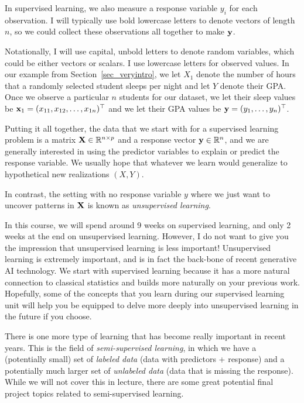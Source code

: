 In supervised learning, we also measure a response variable $y_i$ for each observation. I will typically use bold lowercase letters to denote vectors of length $n$, so we could collect these observations all together to make $\bold{y}$.

Notationally, I will use capital, unbold letters to denote random variables, which could be either vectors or scalars. I use lowercase letters for observed values. In our example from Section~\ref{sec_veryintro}, we let $X_1$ denote the number of hours that a randomly selected student sleeps per night and let $Y$ denote their GPA. Once we observe a particular $n$ students for our dataset, we let their sleep values be $\bold{x}_1 = (x_{11}, x_{12},\ldots, x_{1n})^\top$ and we let their GPA values be $\bold{y} = (y_1,\ldots,y_{n})^\top$.  

Putting it all together, the data that we start with for a supervised learning problem is a matrix $\bold{X} \in \mathbb{R}^{n \times p}$ and a response vector $\bold{y} \in \mathbb{R}^n$, and we are generally interested in using the predictor variables to explain or predict the response variable. We usually hope that whatever we learn would generalize to hypothetical new realizations $(X,Y)$. 

In contrast, the setting with no response variable $y$ where we just want to uncover patterns in $\bold{X}$ is known as \emph{unsupervised learning}.

In this course, we will spend around 9 weeks on supervised learning, and only 2 weeks at the end on unsupervised learning. However, I do not want to give you the impression that unsupervised learning is less important! Unsupervised learning is extremely important, and is in fact the back-bone of recent generative AI technology. We start with supervised learning because it has a more natural connection to classical statistics and builds more naturally on your previous work. Hopefully, some of the concepts that you learn during our supervised learning unit will help you be equipped to delve more deeply into unsupervised learning in the future if you choose.

 There is one more type of learning that has become really important in recent years. This is the field of \emph{semi-supervised learning}, in which we have a (potentially small) set of \emph{labeled data} (data with predictors + response) and a potentially much larger set of \emph{unlabeled data} (data that is missing the response). While we will not cover this in lecture, there are some great potential final project topics related to semi-supervised learning. 
  
